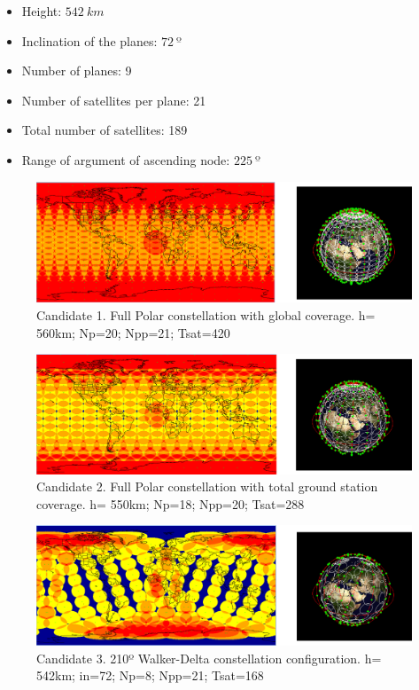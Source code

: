 \begin{itemize}
\item Height: $542~{km}$ 
\item Inclination of the planes: $72~{º}$  
\item Number of planes: 9
\item Number of satellites per plane: 21
\item Total number of satellites: 189
\item Range of argument of ascending node: $225~{º}$
\end{itemize}

\begin{figure}[H] %
	\centering
	\includegraphics[width=1\textwidth]{Candidate1.png}
	\caption{Candidate 1. Full Polar constellation with global coverage.
			 h= 560km; Np=20; Npp=21; Tsat=420 }
	\label{fig:Candidate1}
\end{figure}

\begin{figure}[H] %
	\centering
	\includegraphics[width=1\textwidth]{Candidate2.png}
	\caption{Candidate 2. Full Polar constellation with total ground station coverage.
			 h= 550km; Np=18; Npp=20; Tsat=288 }
	\label{fig:Candidate2}
\end{figure}

\begin{figure}[H] %
	\centering
	\includegraphics[width=1\textwidth]{Candidate3.png}
	\caption{Candidate 3. 210º Walker-Delta constellation configuration.
			 h= 542km; in=72; Np=8; Npp=21; Tsat=168 }
	\label{fig:Candidate3}
\end{figure}

